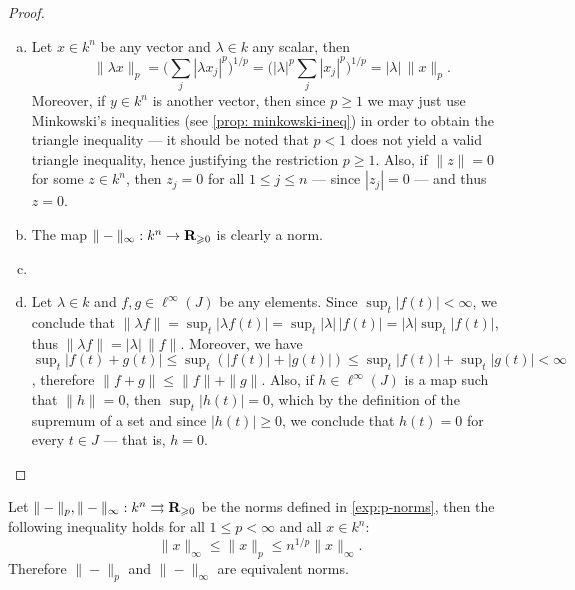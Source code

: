 \begin{proof}
    \begin{enumerate}[(a)]\setlength\itemsep{0em}
        \item Let \(x \in k^n\) be any vector and \(\lambda \in k\) any scalar, then
              \[
                  \| \lambda x \|_p
                  = \bigg( \sum_j | \lambda x_j |^p \bigg)^{1/p}
                  = \bigg( |\lambda|^p \sum_j | x_j |^p \bigg)^{1/p}
                  = |\lambda|\, \| x \|_p.
              \]
              Moreover, if \(y \in k^n\) is another vector, then since \(p \geq 1\) we may
              just use Minkowski's inequalities (see \cref{prop: minkowski-ineq}) in order to
              obtain the triangle inequality --- it should be noted that \(p < 1\) does not
              yield a valid triangle inequality, hence justifying the restriction \(p \geq
              1\). Also, if \(\| z \| = 0\) for some \(z \in k^n\), then \(z_j = 0\) for all
              \(1 \leq j \leq n\) --- since \(|z_j| = 0\) --- and thus \(z = 0\).

        \item The map \(\| - \|_{\infty}: k^n \to \mathbf{R}_{\geqslant 0}\) is clearly a norm.

        \item

        \item Let \(\lambda \in k\) and \(f, g \in \ell^{\infty}(J)\) be any
              elements. Since \(\sup_t |f(t)| < \infty\), we conclude that \(\| \lambda f \| =
              \sup_t |\lambda f(t)| = \sup_t |\lambda|\, |f(t)| = |\lambda| \sup_t |f(t)|\),
              thus \(\| \lambda f \| = |\lambda|\, \| f \|\). Moreover, we have \(\sup_t |f(t)
              + g(t)| \leq \sup_t (|f(t)| + |g(t)|) \leq \sup_t |f(t)| + \sup_t |g(t)| <
              \infty\), therefore \(\| f + g \| \leq \| f \| + \| g \|\). Also, if \(h \in
              \ell^{\infty}(J)\) is a map such that \(\| h \| = 0\), then \(\sup_t |h(t)| =
              0\), which by the definition of the supremum of a set and since \(|h(t)| \geq
              0\), we conclude that \(h(t) = 0\) for every \(t \in J\) --- that is, \(h = 0\).
    \end{enumerate}
\end{proof}

\begin{lemma}
    \label{lem:p-norms-equivalent-finite-case}
    Let \(\| - \|_p, \| - \|_{\infty}: k^n \rightrightarrows \mathbf{R}_{\geqslant 0}\) be the
    norms defined in \cref{exp:p-norms}, then the following inequality holds for all
    \(1 \leq p < \infty\) and all \(x \in k^n\):
    \[
        \| x \|_{\infty} \leq \| x \|_p \leq n^{1/p} \| x \|_{\infty}.
    \]
    Therefore \(\| - \|_p\) and \(\| - \|_{\infty}\) are equivalent norms.
\end{lemma}

